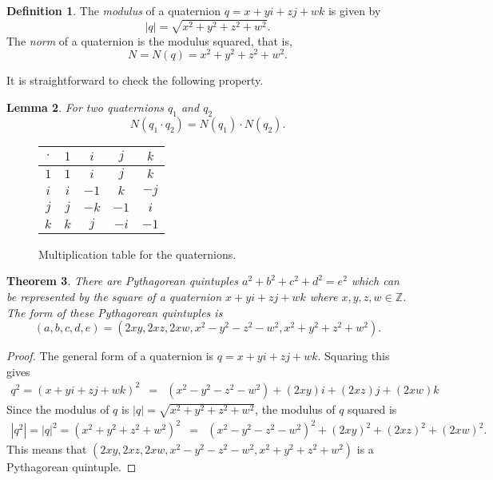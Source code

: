 \documentclass[12pt,table]{article}
\newtheorem{theorem}{Theorem}[section]
\newtheorem{lemma}[theorem]{Lemma}
\theoremstyle{definition}
\newtheorem{definition}[theorem]{Definition}
\theoremstyle{remark}
\newcommand{\Zzz}{\mathbb Z}
\numberwithin{equation}{section}
\begin{document}
\begin{definition}
The {\em modulus} 
of a quaternion
$q =  x+yi+zj+wk$
is given by 
$$
   |q| = \sqrt{x^2 + y^2 + z^2 + w^2}.
$$
The {\em norm} of a quaternion is the modulus squared, that is,
$$
     N =  N(q) = x^2 + y^2 + z^2 + w^2.
$$
\end{definition}


It is straightforward to check the following property.
\begin{lemma}
\label{lemma_norm_multiplicative}
For two quaternions $q_1$ and $q_2$
$$
     N(q_1 \cdot q_2) = N(q_1) \cdot N(q_2).
$$
\end{lemma}



\begin{figure}
\begin{center}
\begin{tabular}{c||c|c|c|c}
$\cdot$ & $1$ & $i$ & $j$ & $k$ \\
\hline
\hline
$1$ & $1$ & $i$ & $j$ & $k$ \\
\hline
$i$ & $i$ & $-1$ & $k$ & $-j$\\
\hline
$j$ & $j$ & $-k$ & $-1$ & $i$ \\
\hline
$k$ & $k$ & $j$ & $-i$ & $-1$
\end{tabular}
\end{center}
\caption{Multiplication table for the quaternions.}
\label{figure_multiplication_table}
\end{figure}



\begin{theorem}
\label{theorem_as_squares}
There are Pythagorean quintuples 
$a^2 + b^2 +c^2 +d^2 = e^2$ which can be represented
by the square of a quaternion $x+yi+zj+wk$ where $x, y, z, w \in \Zzz$.
The form of these Pythagorean quintuples is
$$
     (a,b,c,d,e) = (2xy, 2xz, 2xw, x^2 - y^2 - z^2 - w^2, x^2 + y^2 + z^2 +w^2).
$$
\end{theorem}
\begin{proof}
The general
 form of a quaternion is $q = x+yi+zj+wk$.
Squaring this gives
\begin{eqnarray*}
     q^2 = (x + yi + zj +wk)^2
      &=& (x^2- y^2 -z^2 - w^2)+
          (2xy)i + (2xz)j + (2xw)k
\end{eqnarray*}
Since the modulus of $q$ is $|q| = \sqrt{x^2+y^2+z^2+w^2}$, the
modulus of $q$ squared is 
\begin{eqnarray*}
     |q^2| = |q|^2 = (x^2 + y^2 + z^2 +w^2)^2
      &=& (x^2- y^2 -z^2 - w^2)^2 +
          (2xy)^2 + (2xz)^2 + (2xw)^2.
\end{eqnarray*}
This means that 
$(2xy, 2xz, 2xw, x^2 - y^2 - z^2 - w^2, x^2 + y^2 + z^2 +w^2)$
is a Pythagorean quintuple.
\end{proof}
\end{document}

